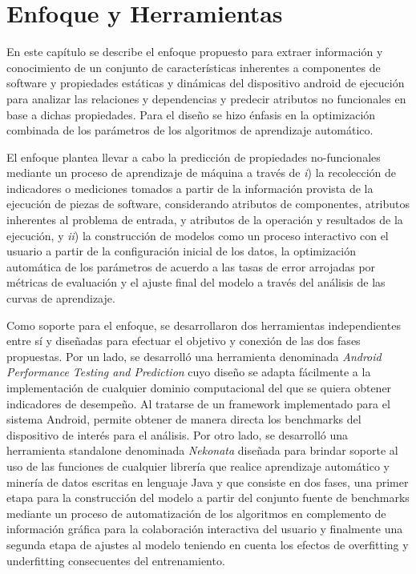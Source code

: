 
\chapter{Enfoque y Herramientas\label{chap:Enfoque-y-Herramientas}}

En este capítulo se describe el enfoque propuesto para extraer información
y conocimiento de un conjunto de características inherentes a componentes
de software y propiedades estáticas y dinámicas del dispositivo android
de ejecución para analizar las relaciones y dependencias y predecir
atributos no funcionales en base a dichas propiedades. Para el diseño
se hizo énfasis en la optimización combinada de los parámetros de
los algoritmos de aprendizaje automático. 

El enfoque plantea llevar a cabo la predicción de propiedades no-funcionales
mediante un proceso de aprendizaje de máquina a través de \emph{i})
la recolección de indicadores o mediciones tomados a partir de la
información provista de la ejecución de piezas de software, considerando
atributos de componentes, atributos inherentes al problema de entrada,
y atributos de la operación y resultados de la ejecución, y \emph{ii})
la construcción de modelos como un proceso interactivo con el usuario
a partir de la configuración inicial de los datos, la optimización
automática de los parámetros de acuerdo a las tasas de error arrojadas
por métricas de evaluación y el ajuste final del modelo a través del
análisis de las curvas de aprendizaje. 

Como soporte para el enfoque, se desarrollaron dos herramientas independientes
entre sí y diseñadas para efectuar el objetivo y conexión de las dos
fases propuestas. Por un lado, se desarrolló una herramienta denominada
\emph{Android Performance Testing and Prediction} cuyo diseño se adapta
fácilmente a la implementación de cualquier dominio computacional
del que se quiera obtener indicadores de desempeño. Al tratarse de
un framework implementado para el sistema Android, permite obtener
de manera directa los benchmarks del dispositivo de interés para el
análisis. Por otro lado, se desarrolló una herramienta standalone
denominada \emph{Nekonata} diseñada para brindar soporte al uso de
las funciones de cualquier librería que realice aprendizaje automático
y minería de datos escritas en lenguaje Java y que consiste en dos
fases, una primer etapa para la construcción del modelo a partir del
conjunto fuente de benchmarks mediante un proceso de automatización
de los algoritmos en complemento de información gráfica para la colaboración
interactiva del usuario y finalmente una segunda etapa de ajustes
al modelo teniendo en cuenta los efectos de overfitting y underfitting
consecuentes del entrenamiento. 

